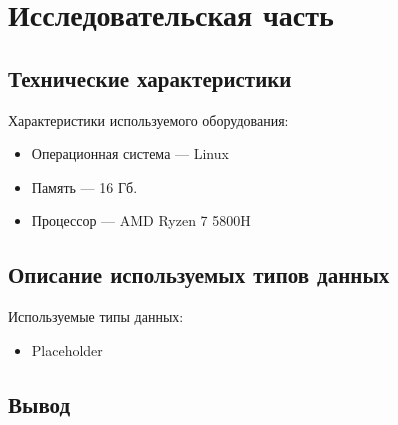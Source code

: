 \chapter{Исследовательская часть}

\section{Технические характеристики}
Характеристики используемого оборудования:
\begin{itemize}
    \item Операционная система --- Linux
    \item Память --- 16 Гб.
    \item Процессор --- AMD Ryzen 7 5800H
\end{itemize}

\section{Описание используемых типов данных}
Используемые типы данных:
\begin{itemize}
	\item Placeholder
\end{itemize}

\section{Вывод}
